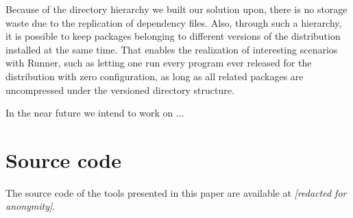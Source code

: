 \documentclass[sigplan, anonymous, 10pt]{acmart}
\begin{document}
Because of the directory hierarchy we built our solution upon, there is
no storage waste due to the replication of dependency files. Also, through
such a hierarchy, it is possible to keep packages belonging to different
versions of the distribution installed at the same time. That enables the
realization of interesting scenarios with Runner, such as letting one run
every program ever released for the distribution with zero configuration,
as long as all related packages are uncompressed under the versioned
directory structure.

In the near future we intend to work on ...

\section{Source code}
The source code of the tools presented in this paper are available at
\emph{[redacted for anonymity]}.



\end{document}
